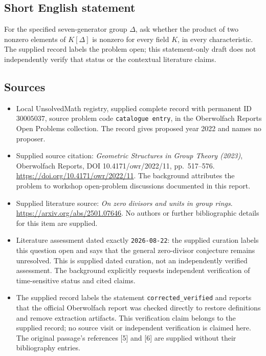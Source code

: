\documentclass[11pt]{article}
\begin{document}
\subsection{Short English statement}
For the specified seven-generator group \(\Delta\), ask whether the product of two nonzero elements of \(K[\Delta]\) is nonzero for every field \(K\), in every characteristic. The supplied record labels the problem open; this statement-only draft does not independently verify that status or the contextual literature claims.
\subsection{Sources}
\begin{itemize}
\item Local UnsolvedMath registry, supplied complete record with permanent ID \(30005037\), source problem code \texttt{catalogue entry}, in the Oberwolfach Reports Open Problems collection. The record gives proposed year 2022 and names no proposer.
\item Supplied source citation: \emph{Geometric Structures in Group Theory (2023)}, Oberwolfach Reports, DOI 10.4171/owr/2022/11, pp.~517--576. \url{https://doi.org/10.4171/owr/2022/11}. The background attributes the problem to workshop open-problem discussions documented in this report.
\item Supplied literature source: \emph{On zero divisors and units in group rings}. \url{https://arxiv.org/abs/2501.07646}. No authors or further bibliographic details for this item are supplied.
\item Literature assessment dated exactly \texttt{2026-08-22}: the supplied curation labels this question open and says that the general zero-divisor conjecture remains unresolved. This is supplied dated curation, not an independently verified assessment. The background explicitly requests independent verification of time-sensitive status and cited claims.
\item The supplied record labels the statement \texttt{corrected\_verified} and reports that the official Oberwolfach report was checked directly to restore definitions and remove extraction artifacts. This verification claim belongs to the supplied record; no source visit or independent verification is claimed here. The original passage's references [5] and [6] are supplied without their bibliography entries.
\end{itemize}
\end{document}
